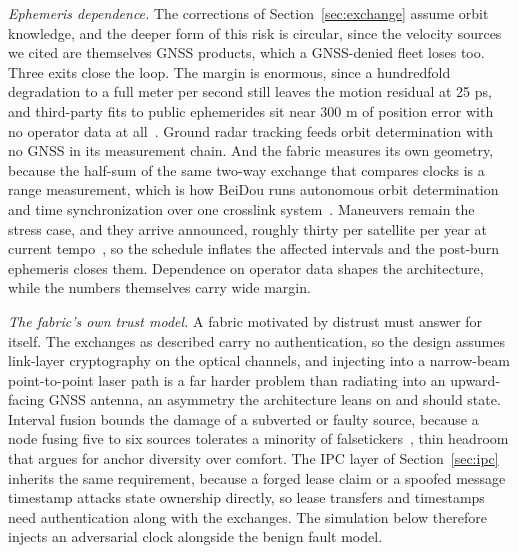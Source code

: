 \documentclass[twocolumn,10pt]{article}
\newcommand{\runin}[1]{\smallskip\noindent\textit{#1.}\hspace{0.6em}}
\begin{document}
\runin{Ephemeris dependence}
The corrections of Section~\ref{sec:exchange} assume orbit knowledge, and the deeper form of this risk is circular, since the velocity sources we cited are themselves GNSS products, which a GNSS-denied fleet loses too. Three exits close the loop. The margin is enormous, since a hundredfold degradation to a full meter per second still leaves the motion residual at 25 ps, and third-party fits to public ephemerides sit near 300 m of position error with no operator data at all~\cite{dyreby2025}. Ground radar tracking feeds orbit determination with no GNSS in its measurement chain. And the fabric measures its own geometry, because the half-sum of the same two-way exchange that compares clocks is a range measurement, which is how BeiDou runs autonomous orbit determination and time synchronization over one crosslink system~\cite{li2025}. Maneuvers remain the stress case, and they arrive announced, roughly thirty per satellite per year at current tempo~\cite{maneuvers2025}, so the schedule inflates the affected intervals and the post-burn ephemeris closes them. Dependence on operator data shapes the architecture, while the numbers themselves carry wide margin.

\runin{The fabric's own trust model}
A fabric motivated by distrust must answer for itself. The exchanges as described carry no authentication, so the design assumes link-layer cryptography on the optical channels, and injecting into a narrow-beam point-to-point laser path is a far harder problem than radiating into an upward-facing GNSS antenna, an asymmetry the architecture leans on and should state. Interval fusion bounds the damage of a subverted or faulty source, because a node fusing five to six sources tolerates a minority of falsetickers~\cite{marzullo1983,rfc5905}, thin headroom that argues for anchor diversity over comfort. The IPC layer of Section~\ref{sec:ipc} inherits the same requirement, because a forged lease claim or a spoofed message timestamp attacks state ownership directly, so lease transfers and timestamps need authentication along with the exchanges. The simulation below therefore injects an adversarial clock alongside the benign fault model.
\end{document}

